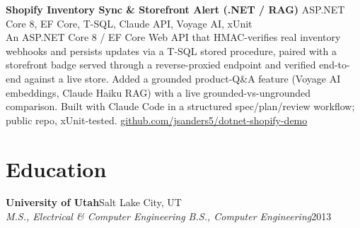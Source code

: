 \documentclass[10.5pt, letterpaper]{article}
\newcommand{\jobentry}[4]{%
  \noindent
  \textbf{\color{accent}#1}\hfill\textcolor{muted}{\small #2}\\
  \textit{#3}\hfill\textcolor{muted}{\small #4}%
}
\begin{document}
\vspace{5pt}

\noindent\textbf{Shopify Inventory Sync \& Storefront Alert (.NET / RAG)}
\hfill\textcolor{muted}{\small ASP.NET Core 8, EF Core, T-SQL, Claude API, Voyage AI, xUnit}\\
An ASP.NET Core 8 / EF Core Web API that HMAC-verifies real inventory webhooks
and persists updates via a T-SQL stored procedure, paired with a storefront
badge served through a reverse-proxied endpoint and verified end-to-end against
a live store. Added a grounded product-Q\&A feature (Voyage AI embeddings,
Claude Haiku RAG) with a live grounded-vs-ungrounded comparison. Built with
Claude Code in a structured spec/plan/review workflow; public repo, xUnit-tested.
\hfill\textcolor{muted}{\small\href{https://github.com/jsanders5/dotnet-shopify-demo}{github.com/jsanders5/dotnet-shopify-demo}}

\section{Education}

\jobentry{University of Utah}{Salt Lake City, UT}%
  {M.S., Electrical \& Computer Engineering \enspace\textbullet\enspace
   B.S., Computer Engineering}{2013}
\end{document}
